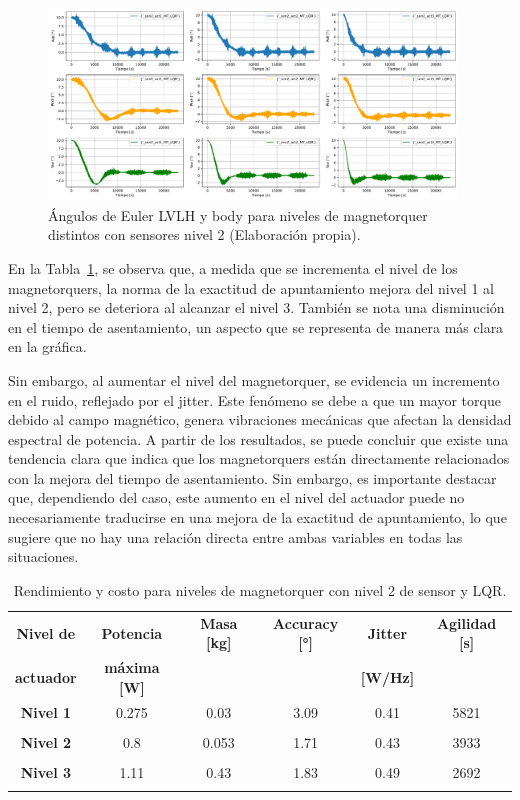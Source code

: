 \begin{figure}[H]
	\centering    
	\includegraphics[width=0.97\textwidth]{MT_LQR_actuadores.pdf}
	\caption{Ángulos de Euler LVLH y body para niveles de magnetorquer distintos con sensores nivel 2 (Elaboración propia).}
	\label{fig:MT_LQR_actuadores}
\end{figure}

En la Tabla~\ref{tab:MT_LQR_actuadores}, se observa que, a medida que se incrementa el nivel de los magnetorquers, la norma de la exactitud de apuntamiento mejora del nivel 1 al nivel 2, pero se deteriora al alcanzar el nivel 3. También se nota una disminución en el tiempo de asentamiento, un aspecto que se representa de manera más clara en la gráfica.

Sin embargo, al aumentar el nivel del magnetorquer, se evidencia un incremento en el ruido, reflejado por el jitter. Este fenómeno se debe a que un mayor torque debido al campo magnético, genera vibraciones mecánicas que afectan la densidad espectral de potencia. A partir de los resultados, se puede concluir que existe una tendencia clara que indica que los magnetorquers están directamente relacionados con la mejora del tiempo de asentamiento. Sin embargo, es importante destacar que, dependiendo del caso, este aumento en el nivel del actuador puede no necesariamente traducirse en una mejora de la exactitud de apuntamiento, lo que sugiere que no hay una relación directa entre ambas variables en todas las situaciones.

\begin{table}[h!]
	\centering
	\caption{Rendimiento y costo para niveles de magnetorquer con nivel 2 de sensor y LQR.}
	\begin{tabular}{|c|c|c|c|c|c|}
		\hline
		\textbf{Nivel de}   & \textbf{Potencia} & \textbf{Masa [kg]} & \textbf{Accuracy [°]} & \textbf{Jitter} & \textbf{Agilidad [s]}  \\ 
		\textbf{actuador}  & \textbf{máxima [W]} & & & \textbf{[W/Hz]} &  \\
		\hline
		\textbf{Nivel 1}   & 0.275  &  0.03  & 3.09 &  0.41 & 5821   \\
		&  &   &  &  &    \\
		\hline
		\textbf{Nivel 2}   & 0.8  & 0.053  & 1.71 & 0.43 & 3933   \\
		& & & & &   \\
		\hline
		\textbf{Nivel 3}   & 1.11  & 0.43  & 1.83 & 0.49 & 2692   \\
		& & & & &   \\
		\hline		
	\end{tabular}
	\label{tab:MT_LQR_actuadores}
\end{table}

